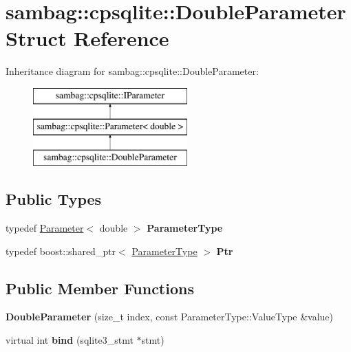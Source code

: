 \hypertarget{structsambag_1_1cpsqlite_1_1_double_parameter}{
\section{sambag::cpsqlite::DoubleParameter Struct Reference}
\label{structsambag_1_1cpsqlite_1_1_double_parameter}
}
Inheritance diagram for sambag::cpsqlite::DoubleParameter:\begin{figure}[H]
\begin{center}
\leavevmode
\includegraphics[height=3.000000cm]{structsambag_1_1cpsqlite_1_1_double_parameter}
\end{center}
\end{figure}
\subsection*{Public Types}
\begin{DoxyCompactItemize}
\item 
\hypertarget{structsambag_1_1cpsqlite_1_1_double_parameter_abafc755c4e2ec8c1792b323dcb910143}{
typedef \hyperlink{structsambag_1_1cpsqlite_1_1_parameter}{Parameter}$<$ double $>$ {\bfseries ParameterType}}
\label{structsambag_1_1cpsqlite_1_1_double_parameter_abafc755c4e2ec8c1792b323dcb910143}

\item 
\hypertarget{structsambag_1_1cpsqlite_1_1_double_parameter_ac2bc850470a7ab26c7e38c81149328fe}{
typedef boost::shared\_\-ptr$<$ \hyperlink{structsambag_1_1cpsqlite_1_1_parameter}{ParameterType} $>$ {\bfseries Ptr}}
\label{structsambag_1_1cpsqlite_1_1_double_parameter_ac2bc850470a7ab26c7e38c81149328fe}

\end{DoxyCompactItemize}
\subsection*{Public Member Functions}
\begin{DoxyCompactItemize}
\item 
\hypertarget{structsambag_1_1cpsqlite_1_1_double_parameter_a847065451e83e4fde75dd7e64a747416}{
{\bfseries DoubleParameter} (size\_\-t index, const ParameterType::ValueType \&value)}
\label{structsambag_1_1cpsqlite_1_1_double_parameter_a847065451e83e4fde75dd7e64a747416}

\item 
\hypertarget{structsambag_1_1cpsqlite_1_1_double_parameter_aeeda1b8eb3b872d8dd29313a9c015ea1}{
virtual int {\bfseries bind} (sqlite3\_\-stmt $\ast$stmt)}
\label{structsambag_1_1cpsqlite_1_1_double_parameter_aeeda1b8eb3b872d8dd29313a9c015ea1}

\end{DoxyCompactItemize}

